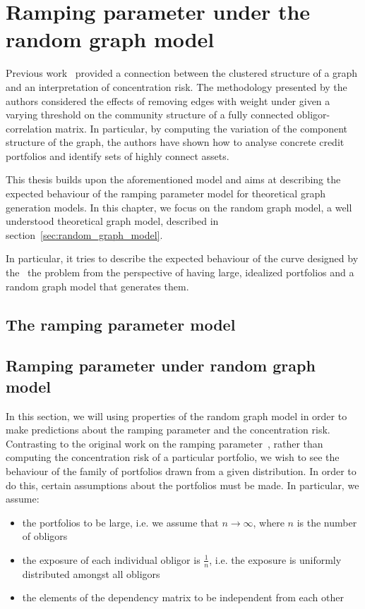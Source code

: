 \chapter{Ramping parameter under the random graph model} %
\label{cha:ramping_parameter_under_the_random_graph_model}

Previous work~\cite{Sindel:2009vd} provided a connection between the clustered structure of a graph and an interpretation of concentration risk.
The methodology presented by the authors considered the effects of removing edges with weight under given a varying threshold on the community structure of a fully connected obligor-correlation matrix.
In particular, by computing the variation of the component structure of the graph, the authors have shown how to analyse concrete credit portfolios and identify sets of highly connect assets.


This thesis builds upon the aforementioned model and aims at describing the expected behaviour of the ramping parameter model for theoretical graph generation models.
In this chapter, we focus on the random graph model, a well understood theoretical graph model, described in section~\vref{sec:random_graph_model}.

In particular, it tries to describe the expected behaviour of the curve designed by the~\cite{Sindel:2009vd} the problem from the perspective of having
large, idealized portfolios 
and a random graph model that generates them.





\section{The ramping parameter model} %
\label{sec:the_ramping_parameter_model}



\section{Ramping parameter under random graph model} %
\label{sec:ramping_parameter_under_random_graph_model}


In this section, we will using properties of the random graph model in order to make predictions about the ramping parameter and the concentration risk.
Contrasting to the original work on the ramping parameter~\cite{Sindel:2009vd}, rather than computing the concentration risk of a particular portfolio, we wish to see the behaviour of the family of portfolios drawn from a given distribution.
In order to do this, certain assumptions about the portfolios must be made.
In particular, we assume:
\begin{itemize}
	\item the portfolios to be large, i.e. we assume that $n \rightarrow \infty$, where $n$ is the number of obligors
	\item the exposure of each individual obligor is $\frac{1}{n}$, i.e. the exposure is uniformly distributed amongst all obligors
	\item the elements of the dependency matrix to be independent from each other
\end{itemize}

